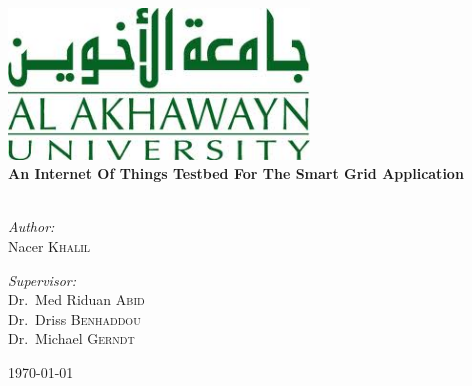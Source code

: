 \begin{titlepage}
\begin{center}
\includegraphics[width=0.6\textwidth]{img/aui_logo.jpg}
\linebreak
\linebreak
\linebreak
\linebreak
\linebreak
\linebreak
\HRule \\[0.4cm]
{ \huge \bfseries An Internet Of Things Testbed For The Smart Grid Application}\\[0.4cm]

\HRule \\[1.5cm]

\begin{minipage}{0.4\textwidth}
\begin{flushleft} \large
\emph{Author:}\\
Nacer \textsc{Khalil}
\end{flushleft}
\end{minipage}
\begin{minipage}{0.4\textwidth}
\begin{flushright} \large
\emph{Supervisor:} \\
Dr.~Med Riduan \textsc{Abid} \\
Dr.~Driss \textsc{Benhaddou} \\
Dr.~Michael \textsc{Gerndt} 
\end{flushright}
\end{minipage}

\vfill

{\large \today}

\end{center}
\end{titlepage}
